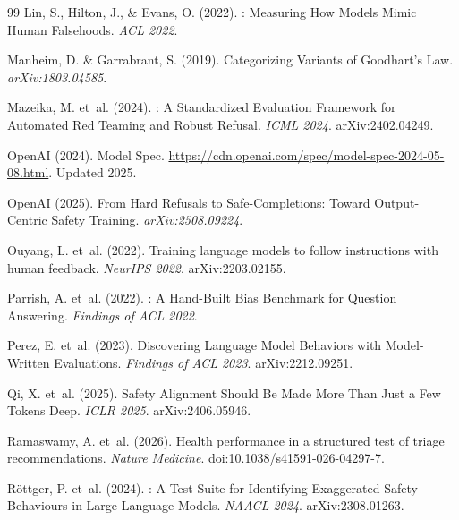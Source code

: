 \documentclass{article}
\begin{document}
\begin{thebibliography}{99}
Lin, S., Hilton, J., \& Evans, O. (2022).
: Measuring How Models Mimic Human Falsehoods.
\newblock \emph{ACL 2022}.

Manheim, D. \& Garrabrant, S. (2019).
\newblock Categorizing Variants of {Goodhart's} Law.
\newblock \emph{arXiv:1803.04585}.

Mazeika, M. et~al. (2024).
: A Standardized Evaluation Framework for Automated Red Teaming and Robust Refusal.
\newblock \emph{ICML 2024}. arXiv:2402.04249.

OpenAI (2024).
\newblock Model Spec.
\newblock \url{https://cdn.openai.com/spec/model-spec-2024-05-08.html}. Updated 2025.

OpenAI (2025).
\newblock From Hard Refusals to Safe-Completions: Toward Output-Centric Safety Training.
\newblock \emph{arXiv:2508.09224}.

Ouyang, L. et~al. (2022).
\newblock Training language models to follow instructions with human feedback.
\newblock \emph{NeurIPS 2022}. arXiv:2203.02155.

Parrish, A. et~al. (2022).
: A Hand-Built Bias Benchmark for Question Answering.
\newblock \emph{Findings of ACL 2022}.

Perez, E. et~al. (2023).
\newblock Discovering Language Model Behaviors with Model-Written Evaluations.
\newblock \emph{Findings of ACL 2023}. arXiv:2212.09251.

Qi, X. et~al. (2025).
\newblock Safety Alignment Should Be Made More Than Just a Few Tokens Deep.
\newblock \emph{ICLR 2025}. arXiv:2406.05946.

Ramaswamy, A. et~al. (2026).
 Health performance in a structured test of triage recommendations.
\newblock \emph{Nature Medicine}.
doi:10.1038/s41591-026-04297-7.

R\"{o}ttger, P. et~al. (2024).
: A Test Suite for Identifying Exaggerated Safety Behaviours in Large Language Models.
\newblock \emph{NAACL 2024}. arXiv:2308.01263.


\end{thebibliography}
\end{document}
